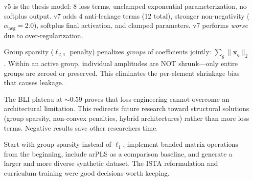 \documentclass[11pt, letterpaper]{article}
\begin{document}
{v5 is the thesis model: 8 loss terms, unclamped exponential parameterization, no softplus output.  v7 adds 4 anti-leakage terms (12 total), stronger non-negativity ($\alpha_{\text{neg}} = 2.0$), softplus final activation, and clamped parameters.  v7 performs \emph{worse} due to over-regularization.}

{Group sparsity ($\ell_{2,1}$ penalty) penalizes \emph{groups} of coefficients jointly: $\sum_g \|\mathbf{x}_g\|_2$.  Within an active group, individual amplitudes are NOT shrunk---only entire groups are zeroed or preserved.  This eliminates the per-element shrinkage bias that causes leakage.}

{The BLI plateau at $\sim$0.59 proves that loss engineering cannot overcome an architectural limitation.  This redirects future research toward structural solutions (group sparsity, non-convex penalties, hybrid architectures) rather than more loss terms.  Negative results save other researchers time.}

{Start with group sparsity instead of $\ell_1$, implement banded matrix operations from the beginning, include arPLS as a comparison baseline, and generate a larger and more diverse synthetic dataset.  The ISTA reformulation and curriculum training were good decisions worth keeping.}
\end{document}
